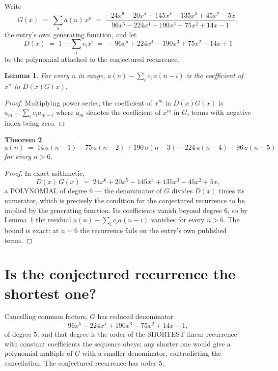 \documentclass[11pt,a4paper]{article}
\theoremstyle{plain}
\newtheorem{theorem}{Theorem}
\newtheorem{lemma}[theorem]{Lemma}
\theoremstyle{definition}
\begin{document}
Write
\[
G(x)\;=\;\sum_{n}a(n)\,x^{n}\;=\;\frac{- 24 x^{6} - 20 x^{5} + 145 x^{4} - 135 x^{3} + 45 x^{2} - 5 x}{96 x^{5} - 224 x^{4} + 190 x^{3} - 75 x^{2} + 14 x - 1},
\]
the entry's own generating function, and let
\[
D(x)\;=\;1-\sum_i c_i x^{i}\;=\;- 96 x^{5} + 224 x^{4} - 190 x^{3} + 75 x^{2} - 14 x + 1
\]
be the polynomial attached to the conjectured recurrence.

\begin{lemma}\label{lem:key}
For every $n$ in range, $a(n)-\sum_i c_i\,a(n-i)$ is the coefficient of $x^{n}$ in
$D(x)G(x)$.
\end{lemma}

\begin{proof}
Multiplying power series, the coefficient of $x^{m}$ in $D(x)G(x)$ is
$a_m-\sum_i c_i a_{m-i}$ where $a_m$ denotes the coefficient of $x^{m}$ in $G$, terms with
negative index being zero.
\end{proof}

\begin{theorem}
\[
a(n)\;=\;14\,a(n-1) - 75\,a(n-2) + 190\,a(n-3) - 224\,a(n-4) + 96\,a(n-5)
\]
for every $n>6$.
\end{theorem}

\begin{proof}
In exact arithmetic,
\[
D(x)\,G(x)\;=\;24 x^{6} + 20 x^{5} - 145 x^{4} + 135 x^{3} - 45 x^{2} + 5 x,
\]
a POLYNOMIAL of degree $6$ --- the denominator of $G$ divides $D(x)$ times its numerator,
which is precisely the condition for the conjectured recurrence to be implied by the
generating function. Its coefficients vanish beyond degree $6$, so by
Lemma~\ref{lem:key} the residual $a(n)-\sum_ic_ia(n-i)$ vanishes for every
$n>6$. The bound is exact: at $n=6$ the recurrence fails on the entry's own published terms.
\end{proof}

\section{Is the conjectured recurrence the shortest one?}

Cancelling common factors, $G$ has reduced denominator
\[
96 x^{5} - 224 x^{4} + 190 x^{3} - 75 x^{2} + 14 x - 1,
\]
of degree $5$, and that degree is the order of the SHORTEST linear recurrence with
constant coefficients the sequence obeys: any shorter one would give a polynomial multiple of
$G$ with a smaller denominator, contradicting the cancellation. The conjectured recurrence has
order $5$.
\end{document}
